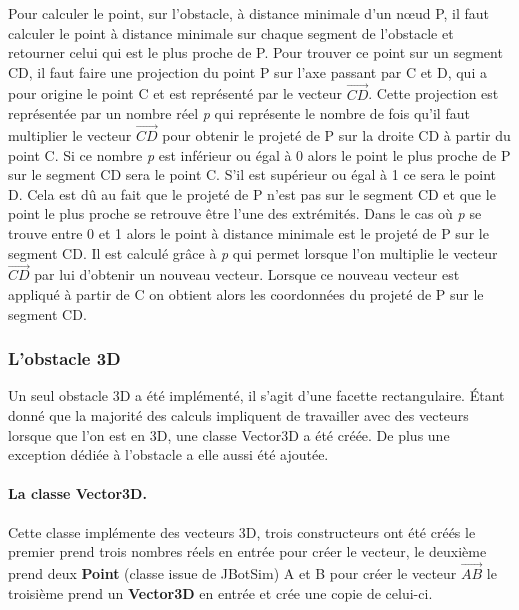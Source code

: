 \documentclass{article}
\begin{document}
Pour calculer le point, sur l'obstacle, à distance minimale d'un n\oe ud P, il faut calculer le point à distance minimale sur chaque segment de l'obstacle et retourner celui qui est le plus proche de P. Pour trouver ce point sur un segment CD, il faut faire une projection du point P sur l'axe passant par C et D, qui a pour origine le point C et est représenté par le vecteur $\overrightarrow{CD}$. Cette projection est représentée par un nombre réel \emph{p} qui représente le nombre de fois qu'il faut multiplier le vecteur $\overrightarrow{CD}$ pour obtenir le projeté de P sur la droite CD à partir du point C. Si ce nombre \emph{p} est inférieur ou égal à 0 alors le point le plus proche de P sur le segment CD sera le point C. S'il est supérieur ou égal à 1 ce sera le point D. Cela est dû au fait que le projeté de P n'est pas sur le segment CD et que le point le plus proche se retrouve être l'une des extrémités. Dans le cas où \emph{p} se trouve entre 0 et 1 alors le point à distance minimale est le projeté de P sur le segment CD. Il est calculé grâce à \emph{p} qui permet lorsque l'on multiplie le vecteur $\overrightarrow{CD}$ par lui d'obtenir un nouveau vecteur. Lorsque ce nouveau vecteur est appliqué à partir de C on obtient alors les coordonnées du projeté de P sur le segment CD.

\subsubsection{L'obstacle 3D}

Un seul obstacle 3D a été implémenté, il s'agit d'une facette rectangulaire. Étant  donné que la majorité des calculs impliquent de travailler avec des vecteurs lorsque que l'on est en 3D, une classe Vector3D a été créée. De plus une exception dédiée à l'obstacle a elle aussi été ajoutée.

\paragraph{La classe Vector3D.}

Cette classe implémente des vecteurs 3D, trois constructeurs ont été créés le premier prend trois nombres réels en entrée pour créer le vecteur, le deuxième prend deux \textbf{Point} (classe issue de JBotSim) A et B pour créer le vecteur $\overrightarrow{AB}$ le troisième prend un \textbf{Vector3D} en entrée et crée une copie de celui-ci.\medskip
\end{document}
